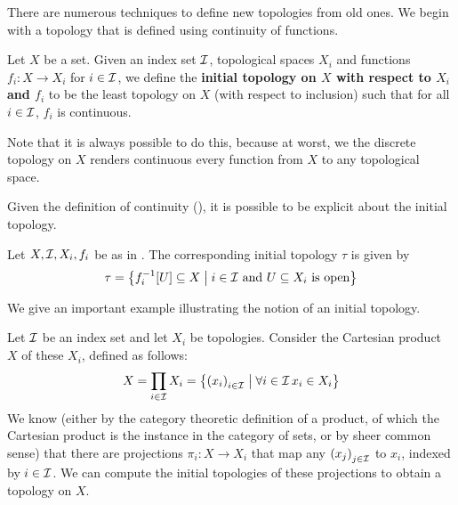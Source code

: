 There are numerous techniques to define new topologies from old ones. We begin with a topology that is defined using continuity of functions.

\begin{boxdefinition}\label{Ch1:Def:Init_Top}
    Let $X$ be a set. Given an index set $\mathcal{I}$, topological spaces $X_i$ and functions $f_i : X \to X_i$ for $i \in \mathcal{I}$, we define the \textbf{initial topology on $X$ with respect to $X_i$ and $f_i$} to be the least topology on $X$ (with respect to inclusion) such that for all $i \in \mathcal{I}$, $f_i$ is continuous.
\end{boxdefinition}

Note that it is always possible to do this, because at worst, we the discrete topology on $X$ renders continuous every function from $X$ to any topological space.

Given the definition of continuity (), it is possible to be explicit about the initial topology.

\begin{boxlemma}
    Let $X, \mathcal{I}, X_i, f_i$ be as in . The corresponding initial topology $\tau$ is given by
    \begin{align*}
        \tau = \left\{ f_i^{-1}\!\left[ U \right] \subseteq X \; \middle\vert \; i \in \mathcal{I} \text{ and } U \subseteq X_i \text{ is open} \right\}
    \end{align*}
\end{boxlemma}

We give an important example illustrating the notion of an initial topology.

\begin{boxexample}[Products]\label{Ch1:Eg:Prod_Top_as_Init_Top}
    Let $\mathcal{I}$ be an index set and let $X_i$ be topologies. Consider the Cartesian product $X$ of these $X_i$, defined as follows:
    \begin{align*}
        X = \prod_{i \in \mathcal{I}} X_i = \left\{ \left( x_i \right)_{i \in \mathcal{I}} \; \middle\vert \; \forall i \in \mathcal{I}\, x_i \in X_i \right\}
    \end{align*}
    We know (either by the category theoretic definition of a product, of which the Cartesian product is the instance in the category of sets, or by sheer common sense) that there are projections $\pi_i : X \to X_i$ that map any $\left( x_j \right)_{j \in \mathcal{I}}$ to $x_i$, indexed by $i \in \mathcal{I}$. We can compute the initial topologies of these projections to obtain a topology on $X$.
\end{boxexample}


